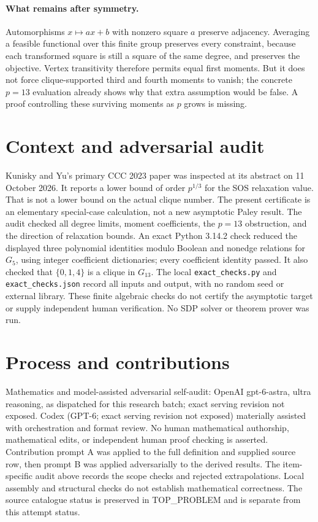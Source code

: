 \documentclass[11pt]{article}
\begin{document}
\paragraph{What remains after symmetry.}
Automorphisms $x\mapsto ax+b$ with nonzero square $a$ preserve adjacency.
Averaging a feasible functional over this finite group preserves every
constraint, because each transformed square is still a square of the same
degree, and preserves the objective. Vertex transitivity therefore permits
equal first moments. But it does not force clique-supported third and
fourth moments to vanish; the concrete $p=13$ evaluation already shows why
that extra assumption would be false. A proof controlling these surviving
moments as $p$ grows is missing.

\section{Context and adversarial audit}
Kunisky and Yu's primary CCC 2023 paper was inspected at its abstract on
11 October 2026. It reports a lower bound of order $p^{1/3}$ for the SOS
relaxation value. That is not a lower bound on the actual clique number.
The present certificate is an elementary special-case calculation, not a
new asymptotic Paley result. The audit checked all degree limits, moment
coefficients, the $p=13$ obstruction, and the direction of relaxation bounds.
An exact Python 3.14.2 check reduced the displayed three polynomial
identities modulo Boolean and nonedge relations for $G_5$, using integer
coefficient dictionaries; every coefficient identity passed. It also checked
that $\{0,1,4\}$ is a clique in $G_{13}$. The local
\texttt{exact\_checks.py} and \texttt{exact\_checks.json} record all inputs
and output, with no random seed or external library. These finite algebraic
checks do not certify the asymptotic target or supply independent human
verification. No SDP solver or theorem prover was run.

\section{Process and contributions}
Mathematics and model-assisted adversarial self-audit: OpenAI gpt-6-astra, ultra reasoning, as dispatched for this research batch; exact serving revision not exposed. Codex (GPT-6; exact serving revision not exposed) materially assisted with orchestration and format review. No human mathematical authorship, mathematical edits, or independent human proof checking is asserted.
Contribution prompt A was applied to the full definition and supplied source row, then prompt B was applied adversarially to the derived results. The item-specific audit above records the scope checks and rejected extrapolations. Local assembly and structural checks do not establish mathematical correctness. The source catalogue status is preserved in TOP\_PROBLEM and is separate from this attempt status.
\end{document}
